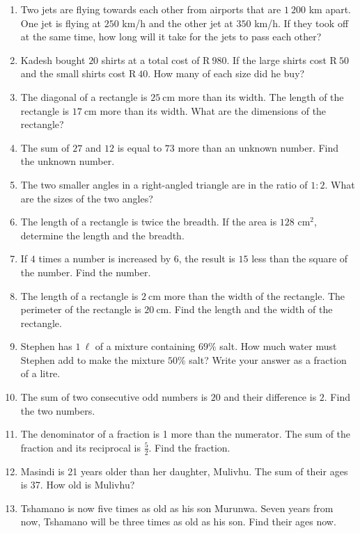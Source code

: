 \begin{exercises}{}
{
\begin{enumerate}[noitemsep, label=\textbf{\arabic*}. ] 
\item Two jets are flying towards each other from airports that are $1~200$ km apart. One jet is flying at $250$ km/h and the other jet at $350$ km/h. If they took off at the same time, how long will it take for the jets to pass each other?
\item Kadesh bought $20$ shirts at a total cost of R$~980$. If the
  large shirts cost R$~50$ and the small shirts cost R$~40$. How many
  of each size did he buy?
\item The diagonal of a rectangle is $25~$cm more than its width. The length of the rectangle is $17~$cm more than its width. What are the dimensions of the rectangle?  
\item The sum of $27$ and $12$ is equal to $73$ more than an unknown number. Find the unknown number.
\item The two smaller angles in a right-angled triangle are in the ratio of $1:2$. What are the sizes of the two angles? 
\item The length of a rectangle is twice the breadth. If the area is $128$ cm$^{2}$, determine the length and the breadth.       
\item If $4$ times a number is increased by $6$, the result is $15$ less than the square of the number. Find the number.
\item The length of a rectangle is $2~$cm more than the width of the rectangle. The perimeter of the rectangle is $20~$cm. Find the length and the width of the rectangle.
\item Stephen has $1~\ell{}$ of a mixture containing $69\%$ salt. How much water must Stephen add to make the mixture $50\%$ salt? Write your answer as a fraction of a litre.
\item The sum of two consecutive odd numbers is $20$ and their difference is $2$. Find the two numbers. 
\item The denominator of a fraction is 1 more than the numerator. The sum of the fraction and its reciprocal is $\frac{5}{2}$. Find the fraction.
\item Masindi is 21 years older than her daughter, Mulivhu. The sum of their ages is 37. How old is Mulivhu? 
\item Tshamano is now five times as old as his son Murunwa. Seven years from now, Tshamano will be three times as old as his son. Find their ages now.    
\end{enumerate}

}
\end{exercises}


